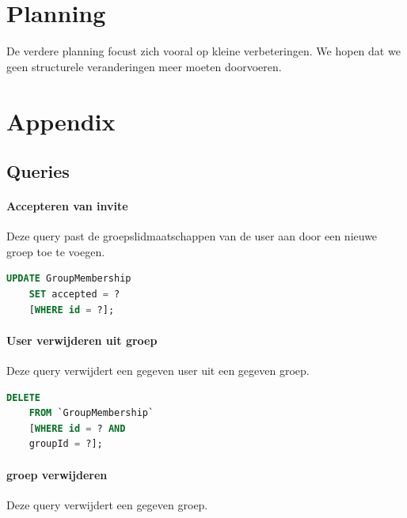 \documentclass[11pt]{article}
\begin{document}
\section{Planning}


De verdere planning focust zich vooral op kleine verbeteringen.
We hopen dat we geen structurele veranderingen meer moeten doorvoeren.



\section{Appendix}

\subsection{Queries}

\paragraph{Accepteren van invite}

  Deze query past de groepslidmaatschappen van de user aan door een nieuwe groep toe te voegen.

  \begin{framed}
  \begin{lstlisting}[language=sql]
    UPDATE GroupMembership
    SET accepted = ?
    [WHERE id = ?];
  \end{lstlisting}
  \end{framed}

\paragraph{User verwijderen uit groep}

  Deze query verwijdert een gegeven user uit een gegeven groep.

  \begin{framed}
  \begin{lstlisting}[language=sql]
    DELETE 
    FROM `GroupMembership` 
    [WHERE id = ? AND 
    groupId = ?];
  \end{lstlisting}
  \end{framed}
  
\paragraph{groep verwijderen}

  Deze query verwijdert een gegeven groep.
\end{document}
